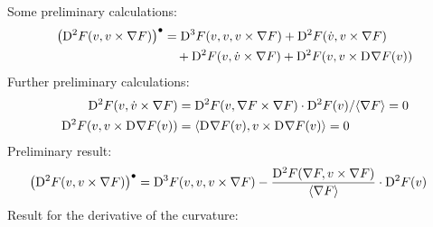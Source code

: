 Some preliminary calculations:
\begin{align}
    \left( \mathrm{D}^{ 2 }F( v, v \times \nabla F ) \right)^\bullet
    &=
    \mathrm{D}^{ 3 }F( v, v, v \times \nabla F )  +
    \mathrm{D}^{ 2 }F( \dot{ v }, v \times \nabla F )  \nonumber\\
    &\quad+
    \mathrm{D}^{ 2 }F( v, \dot{ v } \times \nabla F )  +
    \mathrm{D}^{ 2 }F( v, v \times \mathrm{D}^{  }\nabla F( v ) )
\end{align}
Further preliminary calculations:
\begin{subequations}
    \begin{align}
        \mathrm{D}^{ 2 }F( v, \dot{v} \times \nabla F )
        &=
        \mathrm{D}^{ 2 }F( v, \nabla F \times \nabla F ) \cdot
        \mathrm{D}^{ 2 }F( v ) / \langle  \nabla F  \rangle   =   0   \\
        \mathrm{D}^{ 2 }F( v,  v \times \mathrm{D}^{  }\nabla F( v ) )
        &=
        \langle  \mathrm{D}^{  }\nabla F( v ) ,  v \times \mathrm{D}^{  }\nabla F( v )  \rangle   =   0
    \end{align}
\end{subequations}
Preliminary result:
\begin{align}
    \left( \mathrm{D}^{ 2 }F( v, v \times \nabla F ) \right)^\bullet
    &=   \mathrm{D}^{ 3 }F( v, v, v \times \nabla F )  -
    \frac{ \mathrm{D}^{ 2 }F( \nabla F, v \times \nabla F ) }{ \langle  \nabla F  \rangle } \cdot
    \mathrm{D}^{ 2 }F( v )
\end{align}
Result for the derivative of the curvature:
